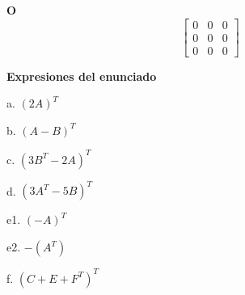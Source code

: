 \documentclass[11pt,a4paper,landscape]{article}
\begin{document}
\par\smallskip \begin{minipage}[t]{.47\linewidth}\centering \textbf{O}\[\begin{bmatrix}0 & 0 & 0\\0 & 0 & 0\\0 & 0 & 0\end{bmatrix}\]\end{minipage}\par\smallskip
\textbf{Expresiones del enunciado}\par
a. \((2A)^T\)\par
b. \((A-B)^T\)\par
c. \((3B^T-2A)^T\)\par
d. \((3A^T-5B)^T\)\par
e1. \((-A)^T\)\par
e2. \(-(A^T)\)\par
f. \((C+E+F^T)^T\)\par
\end{document}
